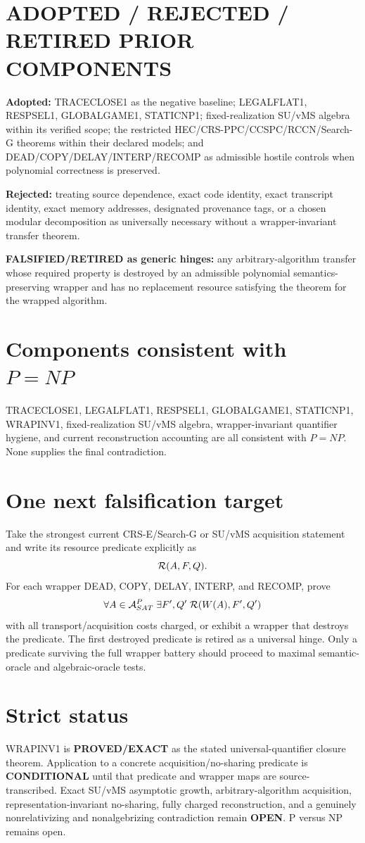 \documentclass[11pt]{article}
\begin{document}
\section*{ADOPTED / REJECTED / RETIRED PRIOR COMPONENTS}
\textbf{Adopted:} TRACECLOSE1 as the negative baseline; LEGALFLAT1, RESPSEL1, GLOBALGAME1, STATICNP1; fixed-realization SU/vMS algebra within its verified scope; the restricted HEC/CRS-PPC/CCSPC/RCCN/Search-G theorems within their declared models; and DEAD/COPY/DELAY/INTERP/RECOMP as admissible hostile controls when polynomial correctness is preserved.

\textbf{Rejected:} treating source dependence, exact code identity, exact transcript identity, exact memory addresses, designated provenance tags, or a chosen modular decomposition as universally necessary without a wrapper-invariant transfer theorem.

\textbf{FALSIFIED/RETIRED as generic hinges:} any arbitrary-algorithm transfer whose required property is destroyed by an admissible polynomial semantics-preserving wrapper and has no replacement resource satisfying the theorem for the wrapped algorithm.

\section*{Components consistent with \(P=NP\)}
TRACECLOSE1, LEGALFLAT1, RESPSEL1, GLOBALGAME1, STATICNP1, WRAPINV1, fixed-realization SU/vMS algebra, wrapper-invariant quantifier hygiene, and current reconstruction accounting are all consistent with \(P=NP\). None supplies the final contradiction.

\section*{One next falsification target}
Take the strongest current CRS-E/Search-G or SU/vMS acquisition statement and write its resource predicate explicitly as
\[
{\cal R}(A,F,Q).
\]
For each wrapper DEAD, COPY, DELAY, INTERP, and RECOMP, prove
\[
\forall A\in{\cal A}_{SAT}^{P}\;\exists F',Q'\;
{\cal R}(W(A),F',Q')
\]
with all transport/acquisition costs charged, or exhibit a wrapper that destroys the predicate. The first destroyed predicate is retired as a universal hinge. Only a predicate surviving the full wrapper battery should proceed to maximal semantic-oracle and algebraic-oracle tests.

\section*{Strict status}
WRAPINV1 is \textbf{PROVED/EXACT} as the stated universal-quantifier closure theorem. Application to a concrete acquisition/no-sharing predicate is \textbf{CONDITIONAL} until that predicate and wrapper maps are source-transcribed. Exact SU/vMS asymptotic growth, arbitrary-algorithm acquisition, representation-invariant no-sharing, fully charged reconstruction, and a genuinely nonrelativizing and nonalgebrizing contradiction remain \textbf{OPEN}. P versus NP remains open.
\end{document}
